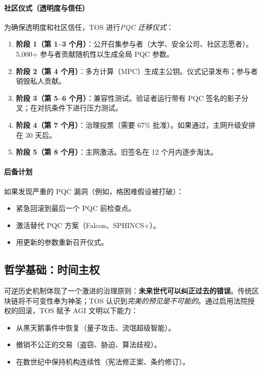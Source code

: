 \documentclass[11pt]{article}
\begin{document}
\paragraph{社区仪式（透明度与信任）}
为确保透明度和社区信任，TOS 进行\emph{PQC 迁移仪式}：
\begin{enumerate}[noitemsep]
  \item \textbf{阶段 1（第 1--3 个月）}：公开召集参与者（大学、安全公司、社区志愿者）。5,000+ 参与者贡献随机性以生成全局 PQC 参数。
  \item \textbf{阶段 2（第 4 个月）}：多方计算（MPC）生成主公钥。仪式记录发布；参与者销毁私人贡献。
  \item \textbf{阶段 3（第 5--6 个月）}：兼容性测试。验证者运行带有 PQC 签名的影子分叉；在对抗条件下进行压力测试。
  \item \textbf{阶段 4（第 7 个月）}：治理投票（需要 67\% 批准）。如果通过，主网升级安排在 30 天后。
  \item \textbf{阶段 5（第 8 个月）}：主网激活。旧签名在 12 个月内逐步淘汰。
\end{enumerate}

\paragraph{后备计划}
如果发现严重的 PQC 漏洞（例如，格困难假设被打破）：
\begin{itemize}[noitemsep]
  \item 紧急回滚到最后一个 PQC 前检查点。
  \item 激活替代 PQC 方案（Falcon、SPHINCS+）。
  \item 用更新的参数重新召开仪式。
\end{itemize}

\subsection{哲学基础：时间主权}

可逆历史机制体现了一个激进的治理原则：\textbf{未来世代可以纠正过去的错误}。传统区块链将不可变性奉为神圣；TOS 认识到\emph{完美的预见是不可能的}。通过启用法院授权的回滚，TOS 赋予 AGI 文明以下能力：
\begin{itemize}[noitemsep]
  \item 从黑天鹅事件中恢复（量子攻击、流氓超级智能）。
  \item 撤销不公正的交易（盗窃、胁迫、算法歧视）。
  \item 在数世纪中保持机构连续性（宪法修正案、条约修订）。
\end{itemize}
\end{document}
